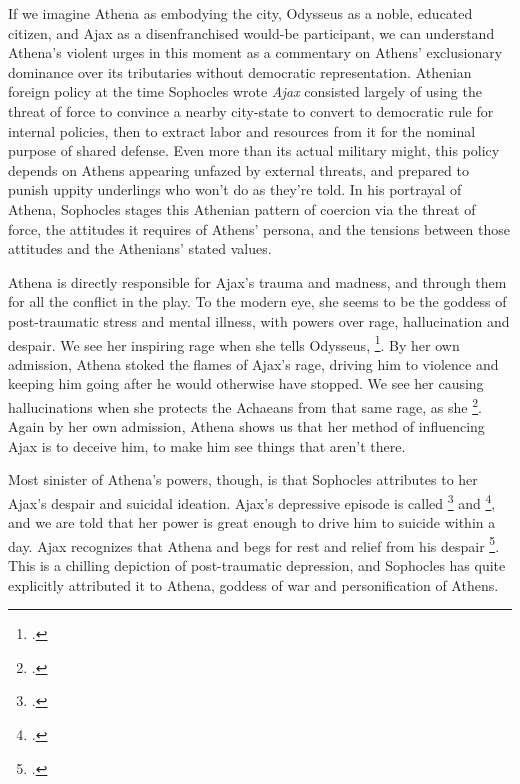 If we imagine Athena as embodying the city, Odysseus as a noble, educated citizen, and
Ajax as a disenfranchised would-be participant, we can understand Athena's violent urges
in this moment as a commentary on Athens' exclusionary dominance over its tributaries
without democratic representation. Athenian foreign policy at the time Sophocles wrote
\textit{Ajax} consisted largely of using the threat of force to convince a nearby
city-state to convert to democratic rule for internal policies, then to extract labor and
resources from it for the nominal purpose of shared defense. Even more than its actual
military might, this policy depends on Athens appearing unfazed by external threats, and
prepared to punish uppity underlings who won't do as they're told. In his portrayal of
Athena, Sophocles stages this Athenian pattern of coercion via the threat of force, the
attitudes it requires of Athens' persona, and the tensions between those attitudes and the
Athenians' stated values.


Athena is directly responsible for Ajax's trauma and madness, and
through them for all the conflict in the play. To the modern eye, she seems to be the
goddess of post-traumatic stress and mental illness, with powers over rage, hallucination
and despair. We see her inspiring rage when she tells Odysseus,  \footcite[ll. 59--60]{ajax}. By her own admission, Athena stoked the
flames of Ajax's rage, driving him to violence and keeping him going after he would
otherwise have stopped. We see her causing hallucinations when she protects the Achaeans
from that same rage, as she  \footcite[l. 65]{ajax}. Again by her own admission,
Athena shows us that her method of influencing Ajax is to deceive him, to make him see
things that aren't there.

Most sinister of Athena's powers, though, is that Sophocles attributes to her Ajax's
despair and suicidal ideation. Ajax's depressive episode is called  \footcite[l. 757]{ajax} and  \footcite[l. 778]{ajax}, and we are told that her power is great enough to drive
him to suicide within a day. Ajax recognizes that Athena  and begs for rest and relief from his despair
\footcite[ll. 400--405]{ajax}. This is a chilling depiction of post-traumatic depression,
and Sophocles has quite explicitly attributed it to Athena, goddess of war and
personification of Athens.

